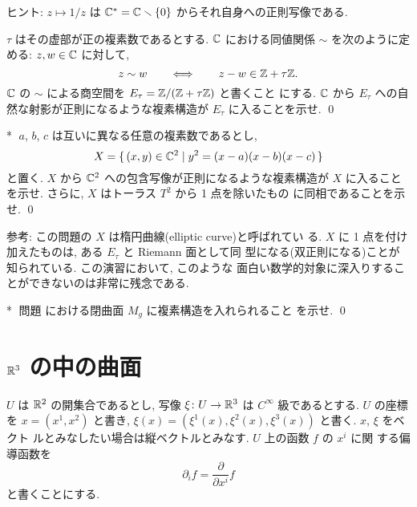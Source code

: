 \documentclass[12pt,twoside]{jarticle}
\def\qstar#1{$\!\!\!$#1$\;$}
\def\Z{{\Bbb Z}} %
\def\R{{\Bbb R}} %
\def\C{{\Bbb C}} %
\def\pd#1#2{\frac{\partial #1}{\partial #2}}
\def\rd{\partial}
\begin{document}
\noindent ヒント: $z \mapsto 1/z$ は %
$\C^\ast = \C \setminus \{0\}$ からそれ自身への正則写像である. 

\begin{question}
  $\tau$ はその虚部が正の複素数であるとする. $\C$ における同値関係 %
  $\sim$ を次のように定める: $z,w\in\C$ に対して,
  \[
    z \sim w
    \qquad\Longleftrightarrow\qquad
    z - w \in \Z + \tau \Z.
  \] %
  $\C$ の $\sim$ による商空間を $E_\tau = \Z/(\Z + \tau\Z)$ と書くこと
  にする. $\C$ から $E_\tau$ への自然な射影が正則になるような複素構造が %
  $E_\tau$ に入ることを示せ. \qed
\end{question}

\begin{question}\qstar{*}
  $a$, $b$, $c$ は互いに異なる任意の複素数であるとし, 
  \[
    X = \{\, (x,y) \in \C^2 \mid y^2 = (x - a)(x - b)(x - c) \,\}
  \] %
  と置く. $X$ から $\C^2$ への包含写像が正則になるような複素構造が $X$ %
  に入ることを示せ. さらに, $X$ はトーラス $T^2$ から 1 点を除いたもの
  に同相であることを示せ.  \qed
\end{question}

\noindent 参考: この問題の $X$ は楕円曲線(elliptic curve)と呼ばれてい
る. $X$ に 1 点を付け加えたものは, ある $E_\tau$ と Riemann 面として同
型になる(双正則になる)ことが知られている. この演習において, このような
面白い数学的対象に深入りすることができないのは非常に残念である.

\begin{question}\qstar{*}
  問題  における閉曲面 $M_g$ に複素構造を入れられること
  を示せ. \qed
\end{question}


\section{$\R^3$ の中の曲面}

$U$ は $\R^2$ の開集合であるとし, 写像 $\xi\colon U \to \R^3$ は %
$C^\infty$ 級であるとする. $U$ の座標を $x = (x^1, x^2)$ と書き, 
$\xi(x) = (\xi^1(x), \xi^2(x), \xi^3(x))$ と書く. $x$, $\xi$ をベクト
ルとみなしたい場合は縦ベクトルとみなす. $U$ 上の函数 $f$ の $x^i$ に関
する偏導函数を
\[
  \rd_i f = \pd{}{x^i} f
\]
と書くことにする. 
\end{document}
